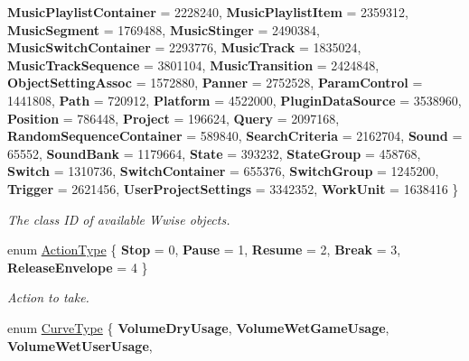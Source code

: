 \begin{DoxyCompactItemize}
{\bfseries Music\+Playlist\+Container} = 2228240, 
{\bfseries Music\+Playlist\+Item} = 2359312, 
\newline
{\bfseries Music\+Segment} = 1769488, 
{\bfseries Music\+Stinger} = 2490384, 
{\bfseries Music\+Switch\+Container} = 2293776, 
{\bfseries Music\+Track} = 1835024, 
\newline
{\bfseries Music\+Track\+Sequence} = 3801104, 
{\bfseries Music\+Transition} = 2424848, 
{\bfseries Object\+Setting\+Assoc} = 1572880, 
{\bfseries Panner} = 2752528, 
\newline
{\bfseries Param\+Control} = 1441808, 
{\bfseries Path} = 720912, 
{\bfseries Platform} = 4522000, 
{\bfseries Plugin\+Data\+Source} = 3538960, 
\newline
{\bfseries Position} = 786448, 
{\bfseries Project} = 196624, 
{\bfseries Query} = 2097168, 
{\bfseries Random\+Sequence\+Container} = 589840, 
\newline
{\bfseries Search\+Criteria} = 2162704, 
{\bfseries Sound} = 65552, 
{\bfseries Sound\+Bank} = 1179664, 
{\bfseries State} = 393232, 
\newline
{\bfseries State\+Group} = 458768, 
{\bfseries Switch} = 1310736, 
{\bfseries Switch\+Container} = 655376, 
{\bfseries Switch\+Group} = 1245200, 
\newline
{\bfseries Trigger} = 2621456, 
{\bfseries User\+Project\+Settings} = 3342352, 
{\bfseries Work\+Unit} = 1638416
 \}
\begin{DoxyCompactList}\small\item\em The class ID of available Wwise objects. \end{DoxyCompactList}\item 
enum \mbox{\hyperlink{class_waapi_c_s_1_1_custom_values_1_1_wwise_values_a5c261935f6f77b4260dc66ddb3e56fb7}{Action\+Type}} \{ \newline
{\bfseries Stop} = 0, 
{\bfseries Pause} = 1, 
{\bfseries Resume} = 2, 
{\bfseries Break} = 3, 
\newline
{\bfseries Release\+Envelope} = 4
 \}
\begin{DoxyCompactList}\small\item\em Action to take. \end{DoxyCompactList}\item 
enum \mbox{\hyperlink{class_waapi_c_s_1_1_custom_values_1_1_wwise_values_a5fa07a83f99814d445c7075a3ebf4850}{Curve\+Type}} \{ \newline
{\bfseries Volume\+Dry\+Usage}, 
{\bfseries Volume\+Wet\+Game\+Usage}, 
{\bfseries Volume\+Wet\+User\+Usage}, 

\end{DoxyCompactItemize}
